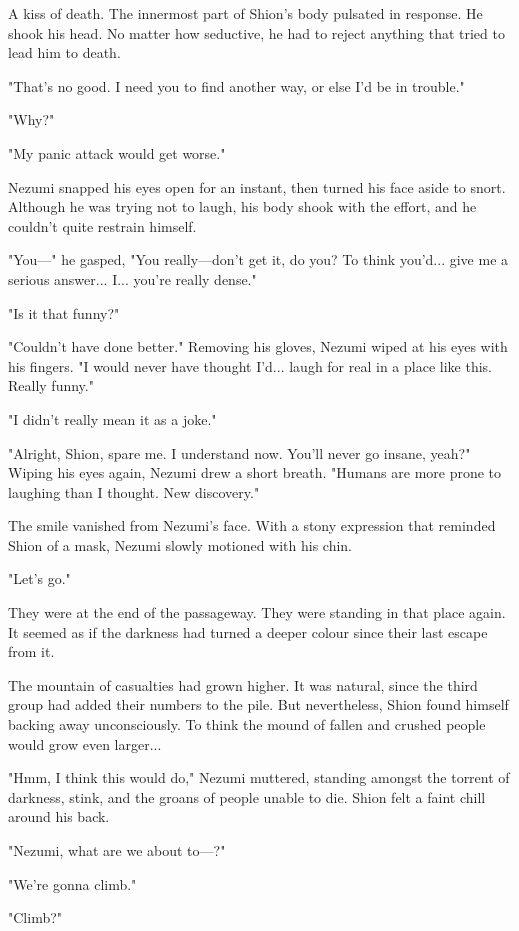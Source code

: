 A kiss of death. The innermost part of Shion's body pulsated in
response. He shook his head. No matter how seductive, he had to reject
anything that tried to lead him to death.

"That's no good. I need you to find another way, or else I'd be in
trouble."

"Why?"

"My panic attack would get worse."

Nezumi snapped his eyes open for an instant, then turned his face aside
to snort. Although he was trying not to laugh, his body shook with the
effort, and he couldn't quite restrain himself.

"You---" he gasped, "You really---don't get it, do you? To think you'd...
give me a serious answer... I... you're really dense."

"Is it that funny?"

"Couldn't have done better." Removing his gloves, Nezumi wiped at his
eyes with his fingers. "I would never have thought I'd... laugh for real
in a place like this. Really funny."

"I didn't really mean it as a joke."

"Alright, Shion, spare me. I understand now. You'll never go insane,
yeah?" Wiping his eyes again, Nezumi drew a short breath. "Humans are
more prone to laughing than I thought. New discovery."

The smile vanished from Nezumi's face. With a stony expression that
reminded Shion of a mask, Nezumi slowly motioned with his chin.

"Let's go."

They were at the end of the passageway. They were standing in that place
again. It seemed as if the darkness had turned a deeper colour since
their last escape from it.

The mountain of casualties had grown higher. It was natural, since the
third group had added their numbers to the pile. But nevertheless, Shion
found himself backing away unconsciously. To think the mound of fallen
and crushed people would grow even larger...

"Hmm, I think this would do," Nezumi muttered, standing amongst the
torrent of darkness, stink, and the groans of people unable to die.
Shion felt a faint chill around his back.

"Nezumi, what are we about to---?"

"We're gonna climb."

"Climb?"

